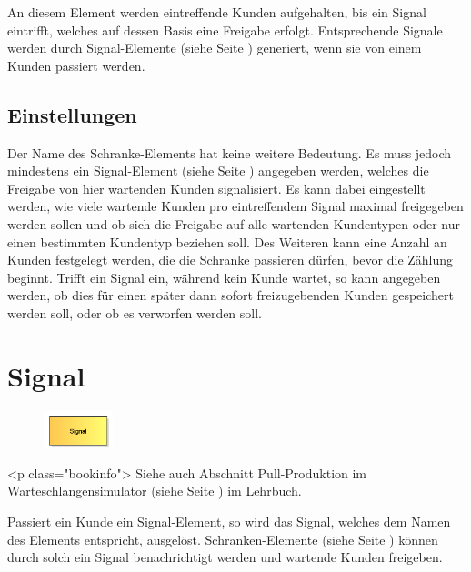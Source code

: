 An diesem Element werden eintreffende Kunden aufgehalten, bis ein Signal eintrifft, welches auf dessen Basis
eine Freigabe erfolgt. Entsprechende Signale werden durch Signal-Elemente (siehe Seite \pageref{ref:ModelElementSignal}) 
generiert, wenn sie von einem Kunden passiert werden.

\subsection*{Einstellungen}

Der Name des Schranke-Elements hat keine weitere Bedeutung. Es muss jedoch mindestens ein
Signal-Element (siehe Seite \pageref{ref:ModelElementSignal}) angegeben werden, welches die Freigabe
von hier wartenden Kunden signalisiert. Es kann dabei eingestellt werden,
wie viele wartende Kunden pro eintreffendem Signal maximal freigegeben werden sollen und ob sich
die Freigabe auf alle wartenden Kundentypen oder nur einen bestimmten Kundentyp beziehen soll.
Des Weiteren kann eine Anzahl an Kunden festgelegt werden, die die Schranke passieren dürfen,
bevor die Zählung beginnt. Trifft ein Signal ein, während kein Kunde wartet, so kann angegeben
werden, ob dies für einen später dann sofort freizugebenden Kunden gespeichert werden soll,
oder ob es verworfen werden soll.


\section{Signal}
\label{ref:ModelElementSignal}

\begin{figure}
\vspace{-22pt}
\includegraphics[width=2cm]{imageModelElementSignal.png}
\vspace{-22pt}
\end{figure}

<p class="bookinfo">
Siehe auch Abschnitt Pull-Produktion im Warteschlangensimulator (siehe Seite \pageref{ref:book:7.6.3}) im Lehrbuch.

Passiert ein Kunde ein Signal-Element, so wird das Signal, welches dem Namen des Elements entspricht, ausgelöst.
Schranken-Elemente (siehe Seite \pageref{ref:ModelElementBarrier}) können durch solch ein Signal benachrichtigt werden und
wartende Kunden freigeben.

